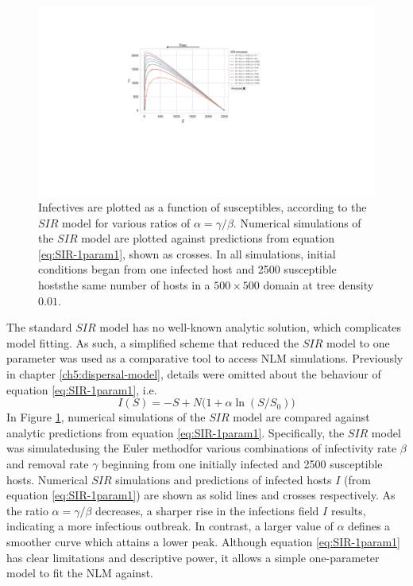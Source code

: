 \label{A:sir-fitting}
\begin{figure}
    \centering
    \includegraphics[scale=0.54]{chapter5/figures/fig2-sir-fitting-A.pdf}
    \caption{Infectives are plotted as a function of susceptibles, according to the $SIR$ model for various ratios of $\alpha=\gamma / \beta$.
            Numerical simulations of the $SIR$ model are plotted against predictions from equation \ref{eq:SIR-1param1}, shown as crosses.
            In all simulations, initial conditions began from one infected host and 2500 susceptible hosts\textemdash the same number of hosts in a $500\times500$ domain at tree density $0.01$.
            }
    \label{fig:sir-fitting-a}
\end{figure}

The standard $SIR$ model has no well-known analytic solution, which complicates model fitting.
As such, a simplified scheme that reduced the $SIR$ model to one parameter was used as a comparative tool to access NLM simulations.
Previously in chapter \ref{ch5:dispersal-model}, details were omitted about the behaviour of equation \ref{eq:SIR-1param1}, i.e.
\[
I(S) = -S +  N \Big( 1 + \alpha \ln(S / S_0) \Big)
\]
In Figure \ref{fig:sir-fitting-a}, numerical simulations of the $SIR$ model are compared against analytic predictions from equation \ref{eq:SIR-1param1}.
Specifically, the $SIR$ model was simulated\textemdash using the Euler method\textemdash for various combinations of infectivity rate $\beta$ and removal rate $\gamma$ beginning from
one initially infected and 2500 susceptible hosts.
Numerical $SIR$ simulations and predictions of infected hosts $I$ (from equation \ref{eq:SIR-1param1}) are shown as solid lines and crosses respectively.
As the ratio $\alpha=\gamma/\beta$ decreases, a sharper rise in the infections field $I$ results, indicating a more infectious outbreak.
In contrast, a larger value of $\alpha$ defines a smoother curve which attains a lower peak.
Although equation \ref{eq:SIR-1param1} has clear limitations and descriptive power, it allows a simple one-parameter model to fit the NLM against.


